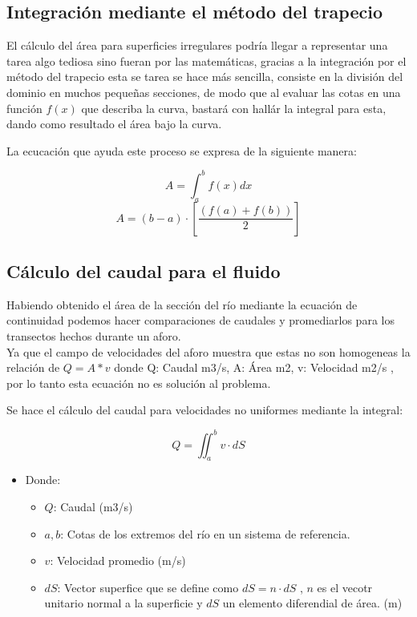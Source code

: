 \documentclass[12pt,a4paper]{report}
\begin{document}
\subsection{Integración mediante el método del trapecio}
El cálculo del área para superficies irregulares podría llegar a representar una tarea algo tediosa sino fueran por las matemáticas, gracias a la integración por el método del trapecio esta se tarea se hace más sencilla, consiste en la división del dominio en muchos pequeñas secciones, de modo que al evaluar las cotas en una función $f(x)$ que describa la curva, bastará con hallár la integral para esta, dando como resultado el área bajo la curva.

La ecucación que ayuda este proceso se expresa de la siguiente manera:

$$ A = \int_{a}^{b} f(x) dx $$
$$A = (b-a)\cdot [\frac{(f(a)+f(b))}{2}]$$


\subsection{Cálculo del caudal para el fluido}
Habiendo obtenido el área de la sección del río mediante la ecuación de continuidad podemos hacer comparaciones de caudales y promediarlos para los transectos hechos durante un aforo.\\

Ya que el campo de velocidades del aforo muestra que estas no son homogeneas la relación de $Q= A * v$ donde Q: Caudal {m3/s}, A: Área {m2}, v: Velocidad {m2/s} , por lo tanto esta ecuación no es solución al problema.

Se hace el cálculo del caudal para velocidades no uniformes mediante la integral:

\[Q = \iint_{a}^{b}v\cdot dS\]

\begin{itemize}
\item Donde:
\begin{itemize}
\item $Q$: Caudal (m3/s)
\item $a, b$: Cotas de los extremos del río en un sistema de referencia.
\item $v$: Velocidad promedio (m/s)
\item $dS$: Vector superfice que se define como $dS = n\cdot dS$ , $n$ es el vecotr unitario normal a la superficie y $dS$ un elemento diferendial de área. (m)
\end{itemize}
\end{itemize}
\end{document}
